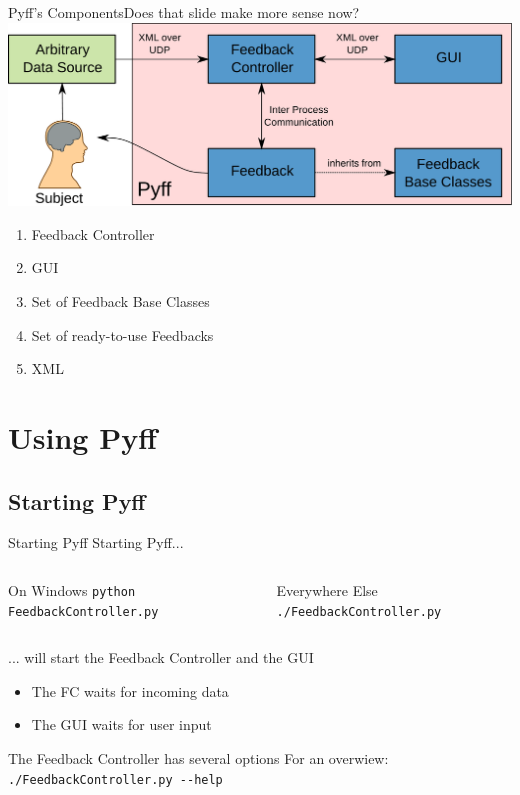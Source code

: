 \documentclass{beamer}
\begin{document}
\begin{frame}{Pyff's Components}{Does that slide make more sense now?}
    \includegraphics[width=\linewidth]{pyff_overview}
    \vfill
    \begin{enumerate}
        \item Feedback Controller
        \item GUI
        \item Set of Feedback Base Classes
        \item Set of ready-to-use Feedbacks
        \item XML
    \end{enumerate}
\end{frame}


\section{Using Pyff}

\subsection{Starting Pyff}
\begin{frame}[fragile]{Starting Pyff}
    Starting Pyff...
    \vfill
    \begin{columns}[T]
            \begin{block}{On Windows}
                \verb+python FeedbackController.py+
            \end{block}
            \begin{block}{Everywhere Else}
                \verb+./FeedbackController.py+
            \end{block}
    \end{columns}
    \vfill
    ... will start the Feedback Controller and the GUI
    \begin{itemize}
        \item The FC waits for incoming data
        \item The GUI waits for user input
    \end{itemize}
    \vfill
    \begin{block}{The Feedback Controller has several options}
        For an overwiew:\\
        \verb+./FeedbackController.py --help+
    \end{block}
\end{frame}
\end{document}
